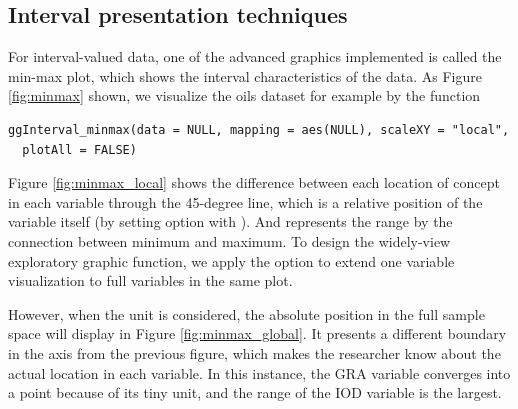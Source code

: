 \documentclass[article]{jss}
\begin{document}

\subsection{Interval presentation techniques}

For interval-valued data, one of the advanced graphics implemented is called the min-max plot, which shows the interval characteristics of the data. As Figure \ref{fig:minmax} shown, we visualize the oils dataset for example by the function 

\begin{verbatim}
ggInterval_minmax(data = NULL, mapping = aes(NULL), scaleXY = "local",
  plotAll = FALSE)
\end{verbatim}


Figure \ref{fig:minmax_local} shows the difference between each location of concept in each variable through the 45-degree line, which is a relative position of the variable itself (by setting option  with ). And represents the range by the connection between minimum and maximum. To design the widely-view exploratory graphic function, we apply the option  to extend one variable visualization to full variables in the same plot.

However, when the unit is considered, the absolute position in the full sample space will display in Figure \ref{fig:minmax_global}. It presents a different boundary in the axis from the previous figure, which makes the researcher know about the actual location in each variable. In this instance, the GRA variable converges into a point because of its tiny unit, and the range of the IOD variable is the largest.
\end{document}
